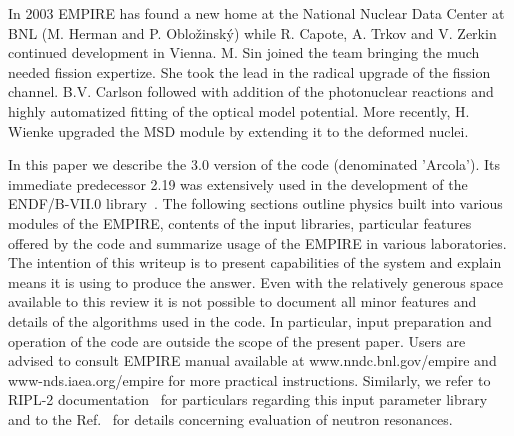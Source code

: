 \documentclass[twocolumn,amsmath,amssymb,10pt,groupedaddress,a4paper]{revtex4}
\begin{document}
In 2003 EMPIRE has found a new home at the National Nuclear Data Center at BNL (M. Herman and P. Oblo\v zinsk\'y) while R. Capote, A. Trkov and V. Zerkin continued development in Vienna. M. Sin joined the team bringing the much needed fission expertize. She took the lead in the radical upgrade of the fission channel. B.V. Carlson followed with addition of the photonuclear reactions and highly automatized fitting of the optical model potential. More recently, H. Wienke upgraded the MSD module by extending it to the deformed nuclei.

In this paper we describe the 3.0 version of the code (denominated 'Arcola'). Its immediate predecessor 2.19 was extensively used in the development of the ENDF/B-VII.0 library~\cite{ENDF-VII}. The following sections outline physics built into various modules of the EMPIRE, contents of the input libraries, particular features offered by the code and summarize usage of the EMPIRE in various laboratories. The intention of this writeup is to present capabilities of the system and explain means it is using to produce the answer. Even with the relatively generous space available to this review it is not possible to document all minor features and details of the algorithms used in the code. In particular, input preparation and operation of the code are outside the scope of the present paper. Users are advised to consult EMPIRE manual available at www.nndc.bnl.gov/empire and www-nds.iaea.org/empire for more practical instructions. Similarly, we
refer to RIPL-2 documentation~\cite{RIPL2} for particulars regarding this input parameter library and to the Ref.~\cite{Mughabghab:06} for details concerning evaluation of neutron resonances.
\end{document}
